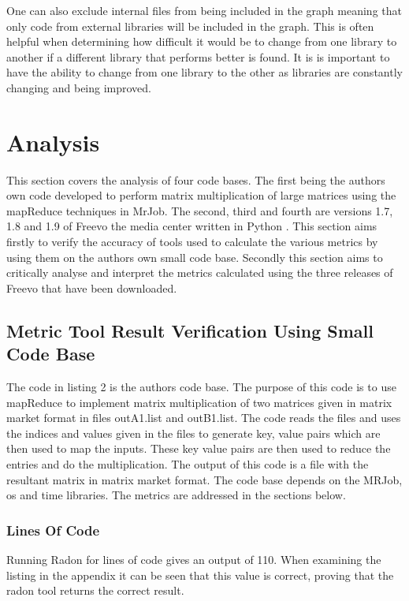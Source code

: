 \documentclass[10.5pt,journal, a4paper]{IEEEtran}
\begin{document}
\noindent
One can also exclude internal files from being included in the graph meaning that only code from external libraries will be included in the graph. This is often helpful when determining how difficult it would be to change from one library to another if a different library that performs better is found. It is is important to have the ability to change from one library to the other as libraries are constantly changing and being improved. 

\section{Analysis}
\noindent
This section covers the analysis of four code bases. The first being the authors own code developed to perform matrix multiplication of large matrices using the mapReduce techniques in MrJob. The second, third and fourth are versions 1.7, 1.8 and 1.9 of Freevo the media center written in Python \cite{Freevo}. This section aims firstly to verify the accuracy of tools used to calculate the various metrics by using them on the authors own small code base. Secondly this section aims to critically analyse and interpret the metrics calculated using the three releases of Freevo that have been downloaded. 

\subsection{Metric Tool Result Verification Using Small Code Base}
\noindent
The code in listing 2 is the authors code base. The purpose of this code is to use mapReduce to implement matrix multiplication of two matrices given in matrix market format in files outA1.list and outB1.list. The code reads the files and uses the indices and values given in the files to generate key, value pairs which are then used to map the inputs. These key value pairs are then used to reduce the entries and do the multiplication. The output of this code is a file with the resultant matrix in matrix market format. The code base depends on the MRJob, os and time libraries. The metrics are addressed in the sections below. 


\subsubsection{Lines Of Code}
\noindent
Running Radon for lines of code gives an output of 110. When examining the listing in the appendix it can be seen that this value is correct, proving that the radon tool returns the correct result.
\end{document}
